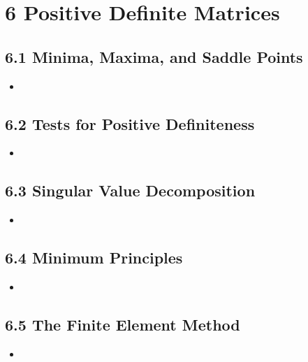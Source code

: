 \chapter{6 Positive Definite Matrices}

\section{6.1 Minima, Maxima, and Saddle Points}
\begin{itemize}
  \item []


\end{itemize}

\section{6.2 Tests for Positive Definiteness}
\begin{itemize}
  \item []


\end{itemize}

\section{6.3 Singular Value Decomposition}
\begin{itemize}
  \item []


\end{itemize}

\section{6.4 Minimum Principles}
\begin{itemize}
  \item []


\end{itemize}

\section{6.5 The Finite Element Method}
\begin{itemize}
  \item []


\end{itemize}
